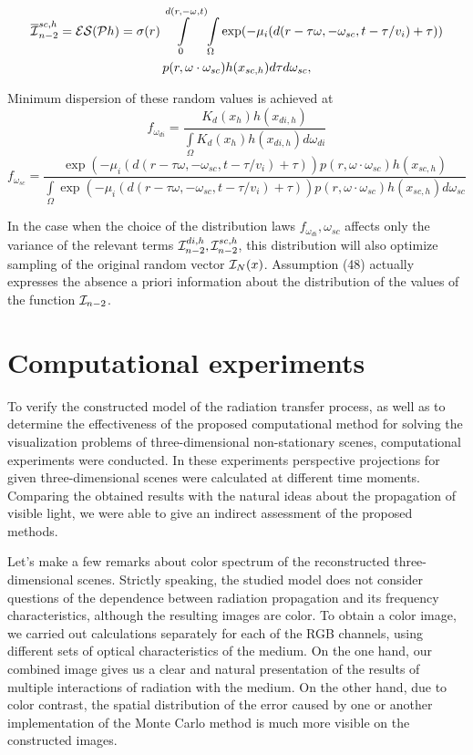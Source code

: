 \documentclass[12pt,reqno]{report}
\begin{document}
{\begin{multline}
{\overline{\cal I}_{n-2}^{sc, h}} = {\cal ES} (\mathcal{P} h) = 
\sigma(r) \int \limits^{d(r,-\omega,t)}_0 \int\limits_{\Omega} \exp(- \mu_i (d(r-\tau\omega, -\omega_{sc}, t-\tau/v_i) + \tau)) \\ 
p(r,\omega \cdot\omega_{sc}) h(x_{sc, h})d\tau d\omega_{sc},
\end{multline}

Minimum dispersion of these random values is achieved at
\begin{equation}
f_{\omega_{di}} =\frac{K_d(x_h) h(x_{di, h})} {\int\limits_{\Omega} K_d(x_h) h(x_{di, h}) d \omega_{di}}
\end{equation}
\begin{equation}
f_{\omega_{sc}} = \frac{\exp(- \mu_i (d(r-\tau\omega, -\omega_{sc}, t-\tau/v_i) + \tau)) p(r,\omega \cdot\omega_{sc}) h(x_{sc, h})}
{\int\limits_{\Omega}\exp(- \mu_i (d(r-\tau\omega, -\omega_{sc}, t-\tau/v_i) + \tau)) p(r,\omega \cdot\omega_{sc}) h(x_{sc, h}) d \omega_{sc}}
\end{equation}

In the case when the choice of the distribution laws 
$f_{\omega_{di}}, \omega_{sc}$ 
affects only the variance of the relevant terms
${\cal I}_{n-2}^{di, h}, {\cal I}_{n-2}^{sc, h}$,
this distribution will also optimize sampling of the original random vector ${\cal I}_N(x)$.
Assumption (48) actually expresses the absence
a priori information about the distribution of the values of the function ${\cal I}_{n-2}$.

\section{Computational experiments}

To verify the constructed model of the radiation transfer process, 
as well as to determine the effectiveness of the proposed computational method 
for solving the visualization problems of three-dimensional non-stationary scenes, 
computational experiments were conducted.
In these experiments perspective projections for given three-dimensional scenes were calculated at different time moments. 
Comparing the obtained results with the natural ideas about the propagation of visible light, 
we were able to give an indirect assessment of the proposed methods.

Let's make a few remarks about color spectrum of the reconstructed three-dimensional scenes. 
Strictly speaking, the studied model does not consider questions of the dependence between radiation propagation and its frequency characteristics, 
although the resulting images are color. To obtain a color image, we carried out calculations separately for each of the RGB channels, 
using different sets of optical characteristics of the medium. 
On the one hand, our combined image gives us a clear and natural presentation of the results of multiple interactions of radiation with the medium. 
On the other hand, due to color contrast, the spatial distribution of the error caused by one or another 
implementation of the Monte Carlo method is much more visible on the constructed images.

}
\end{document}
